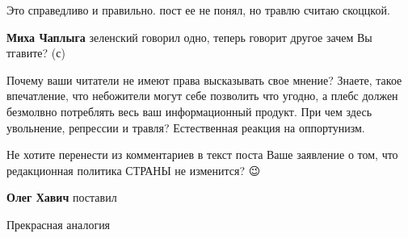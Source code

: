 \begin{itemize}
Это справедливо и правильно. пост ее не понял, но травлю считаю скоццкой.

\begin{itemize}
 
\textbf{Миха Чаплыга} зеленский говорил одно, теперь говорит другое
зачем Вы тгавите? (с)
\end{itemize}

 

Почему ваши читатели не имеют права высказывать свое мнение? Знаете, такое
впечатление, что небожители могут себе позволить что угодно, а плебс должен
безмолвно потреблять весь ваш информационный продукт. При чем здесь увольнение,
репрессии и травля? Естественная реакция на оппортунизм.


 

Не хотите перенести из комментариев в текст поста Ваше заявление о том, что
редакционная политика СТРАНЫ не изменится? 😉

\begin{itemize}
 
\textbf{Олег Хавич} поставил
\end{itemize}

 

Прекрасная аналогия

\begin{itemize}
 


\end{itemize}
\end{itemize}
